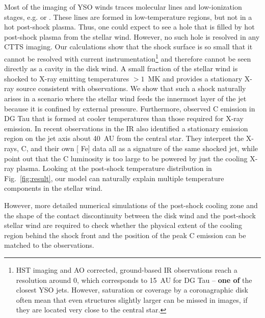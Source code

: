 \documentclass[manuscript]{aastex}
\begin{document}
Most of the imaging of YSO winds traces molecular lines and low-ionization stages, e.g.  or . These lines are formed in low-temperature regions, but not in a hot post-shock plasma. Thus, one could expect to see a hole that is filled by hot post-shock plasma from the stellar wind. However, no such hole is resolved in any CTTS imaging. Our calculations show that the shock surface is so small that it cannot be resolved with current instrumentation\footnote{HST imaging and AO corrected, ground-based IR observations reach a resolution around 0, which corresponds to 15~AU for DG Tau -- \textbf{one of }the closest YSO jets. However, saturation or coverage by a coronagraphic disk often mean that even structures slightly larger can be missed in images, if they are located very close to the central star.} and therefore cannot be seen directly as a cavity in the disk wind. A small fraction of the stellar wind is shocked to X-ray emitting temperatures $>1$~MK and provides a stationary X-ray source consistent with observations. 
We show that such a shock naturally arises in a scenario where the stellar wind feeds the innermost layer of the jet because it is confined by external pressure.
Furthermore, \citet{2013A&A...550L...1S} observed C emission in DG Tau that is formed at cooler temperatures than those required for X-ray emission. In recent observations in the IR \citet{2014arXiv1404.0728W} also identified a stationary emission region on the jet axis about 40~AU from the central star. They interpret the X-rays,  C, and their own [ Fe] data all as a signature of the same shocked jet, while \citet{2013A&A...550L...1S} point out that the C luminosity is too large to be powered by just the cooling X-ray plasma. Looking at the post-shock temperature distribution in Fig.~\ref{fig:result}, our model can naturally explain multiple temperature components in the stellar wind.

However, more detailed numerical simulations of the post-shock cooling zone and the shape of the contact discontinuity between the disk wind and the post-shock stellar wind are required to check whether the physical extent of the cooling region behind the shock front and the position of the peak  C emission can be matched to the observations.
\end{document}
